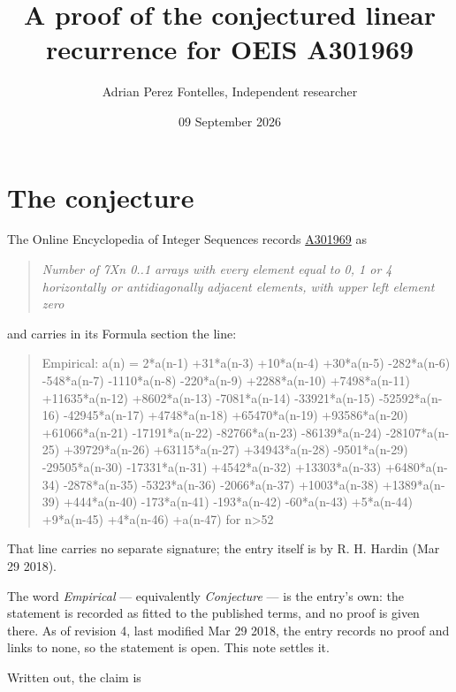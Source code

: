 \documentclass[11pt]{article}
\title{A proof of the conjectured linear recurrence for OEIS A301969}
\author{Adrian Perez Fontelles, Independent researcher}
\date{09 September 2026}
\theoremstyle{definition}
\begin{document}
\maketitle
\section{The conjecture}

The Online Encyclopedia of Integer Sequences records \href{https://oeis.org/A301969}{A301969} as

\begin{quote}\itshape Number of 7Xn 0..1 arrays with every element equal to 0, 1 or 4 horizontally or antidiagonally adjacent elements, with upper left element zero\end{quote}

and carries in its Formula section the line:

\begin{quote}\ttfamily Empirical: a(n) = 2*a(n-1) +31*a(n-3) +10*a(n-4) +30*a(n-5) -282*a(n-6) -548*a(n-7) -1110*a(n-8) -220*a(n-9) +2288*a(n-10) +7498*a(n-11) +11635*a(n-12) +8602*a(n-13) -7081*a(n-14) -33921*a(n-15) -52592*a(n-16) -42945*a(n-17) +4748*a(n-18) +65470*a(n-19) +93586*a(n-20) +61066*a(n-21) -17191*a(n-22) -82766*a(n-23) -86139*a(n-24) -28107*a(n-25) +39729*a(n-26) +63115*a(n-27) +34943*a(n-28) -9501*a(n-29) -29505*a(n-30) -17331*a(n-31) +4542*a(n-32) +13303*a(n-33) +6480*a(n-34) -2878*a(n-35) -5323*a(n-36) -2066*a(n-37) +1003*a(n-38) +1389*a(n-39) +444*a(n-40) -173*a(n-41) -193*a(n-42) -60*a(n-43) +5*a(n-44) +9*a(n-45) +4*a(n-46) +a(n-47) for n>52\end{quote}

That line carries no separate signature; the entry itself is by R. H. Hardin (Mar 29 2018).

The word {\itshape Empirical} --- equivalently {\itshape Conjecture} --- is the entry's own: the statement is recorded as fitted to the published terms, and no proof is given there. As of revision 4, last modified Mar 29 2018, the entry records no proof and links to none, so the statement is open. This note settles it.

Written out, the claim is
\end{document}
